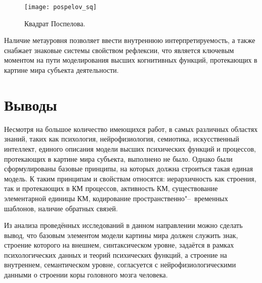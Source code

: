 \begin{figure}[h]
	\centering
	\texttt{[image: pospelov\_sq]}
	\caption{Квадрат Поспелова.}
	\label{fg:pospelov_sq}
\end{figure}
	
Наличие метауровня позволяет ввести внутреннюю интерпретируемость, а также снабжает знаковые системы свойством рефлексии, что является ключевым моментом на пути моделирования высших когнитивных функций, протекающих в картине мира субъекта деятельности.


\section{Выводы} \label{sect1_4}

Несмотря на большое количество имеющихся работ, в самых различных областях знаний, таких как психология, нейрофизиология, семиотика, искусственный интеллект, единого описания модели высших психических функций и процессов, протекающих в картине мира субъекта, выполнено не было. Однако были сформулированы базовые принципы, на которых должна строиться такая единая модель. К таким принципам и свойствам относятся: иерархичность как строения, так и протекающих в КМ процессов, активность КМ, существование элементарной единицы КМ, кодирование пространственно"--~временных шаблонов, наличие обратных связей. 

Из анализа проведённых исследований в данном направлении можно сделать вывод, что базовым элементом модели картины мира должен служить знак, строение которого на внешнем, синтаксическом уровне, задаётся в рамках психологических данных и теорий психических функций, а строение на внутреннем, семантическом уровне, согласуется с нейрофизиологическими данными о строении коры головного мозга человека.

\clearpage
